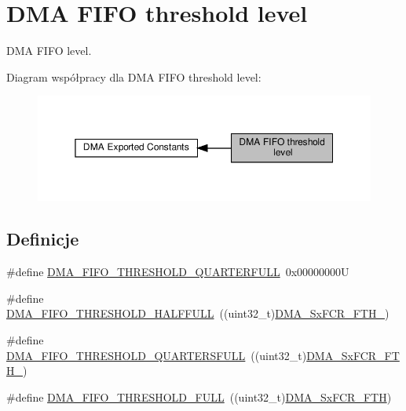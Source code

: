 \hypertarget{group___d_m_a___f_i_f_o__threshold__level}{}\section{D\+MA F\+I\+FO threshold level}
\label{group___d_m_a___f_i_f_o__threshold__level}


D\+MA F\+I\+FO level.  


Diagram współpracy dla D\+MA F\+I\+FO threshold level\+:\nopagebreak
\begin{figure}[H]
\begin{center}
\leavevmode
\includegraphics[width=350pt]{group___d_m_a___f_i_f_o__threshold__level}
\end{center}
\end{figure}
\subsection*{Definicje}
\begin{DoxyCompactItemize}
\item 
\#define \hyperlink{group___d_m_a___f_i_f_o__threshold__level_ga4debbd5733190b61b2115613d4b3658b}{D\+M\+A\+\_\+\+F\+I\+F\+O\+\_\+\+T\+H\+R\+E\+S\+H\+O\+L\+D\+\_\+Q\+U\+A\+R\+T\+E\+R\+F\+U\+LL}~0x00000000U
\item 
\#define \hyperlink{group___d_m_a___f_i_f_o__threshold__level_gad2b071aa3a3bfc936017f12fb956c56f}{D\+M\+A\+\_\+\+F\+I\+F\+O\+\_\+\+T\+H\+R\+E\+S\+H\+O\+L\+D\+\_\+\+H\+A\+L\+F\+F\+U\+LL}~((uint32\+\_\+t)\hyperlink{group___peripheral___registers___bits___definition_ga63716e11d34bca95927671055aa63fe8}{D\+M\+A\+\_\+\+Sx\+F\+C\+R\+\_\+\+F\+T\+H\+\_})
\item 
\#define \hyperlink{group___d_m_a___f_i_f_o__threshold__level_gae1e4ba12bae8440421e6672795d71223}{D\+M\+A\+\_\+\+F\+I\+F\+O\+\_\+\+T\+H\+R\+E\+S\+H\+O\+L\+D\+\_\+Q\+U\+A\+R\+T\+E\+R\+S\+F\+U\+LL}~((uint32\+\_\+t)\hyperlink{group___peripheral___registers___bits___definition_gae3d780fc1222a183071c73e62a0524a1}{D\+M\+A\+\_\+\+Sx\+F\+C\+R\+\_\+\+F\+T\+H\+\_})
\item 
\#define \hyperlink{group___d_m_a___f_i_f_o__threshold__level_ga5de463bb24dc12fe7bbb300e1e4493f7}{D\+M\+A\+\_\+\+F\+I\+F\+O\+\_\+\+T\+H\+R\+E\+S\+H\+O\+L\+D\+\_\+\+F\+U\+LL}~((uint32\+\_\+t)\hyperlink{group___peripheral___registers___bits___definition_ga44c16978164026a81f5b07280e800e7f}{D\+M\+A\+\_\+\+Sx\+F\+C\+R\+\_\+\+F\+TH})
\end{DoxyCompactItemize}


